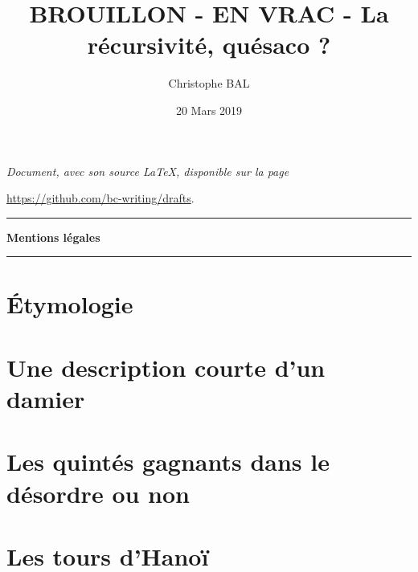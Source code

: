 \documentclass[12pt]{amsart}
\begin{document}
\title{BROUILLON - EN VRAC - La récursivité, quésaco ?}
\author{Christophe BAL}
\date{20 Mars 2019}

\maketitle

\begin{center}
	\itshape
	Document, avec son source \LaTeX, disponible sur la page
	
	\url{https://github.com/bc-writing/drafts}.
\end{center}


\bigskip


\begin{center}
	\hrule\vspace{.3em}
	{
		\fontsize{1.35em}{1em}\selectfont
		\textbf{Mentions \og légales \fg}
	}
			
	\vspace{0.45em}
	\doclicenseThis
	\hrule
\end{center}

	
\setcounter{tocdepth}{2}
\tableofcontents



\section{Étymologie}







\section{Une description courte d'un damier}


\section{Les quintés gagnants dans le désordre ou non}


\section{Les tours d'Hanoï}
\end{document}
